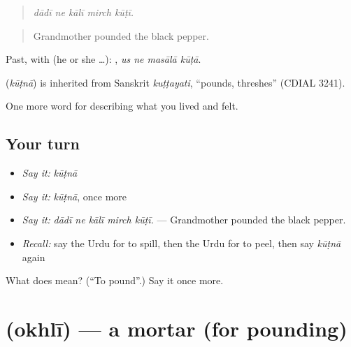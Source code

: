 \begin{quote}
    
\end{quote}

\begin{quote}
\emph{dādī ne kālī mirch kūṭī.}
\end{quote}

\begin{quote}
Grandmother pounded the black pepper.
\end{quote}

Past, with  (he or she …):    , \emph{us ne masālā kūṭā}.

\begin{cousinweb}
\textbf{} (\emph{kūṭnā}) is inherited from Sanskrit \emph{kuṭṭayati}, \textquotedblleft{}pounds, threshes\textquotedblright{} (CDIAL 3241).
\end{cousinweb}

\begin{grammarlens}[title={What you've built}]
One more word for describing what you lived and felt.
\end{grammarlens}

\subsection*{Your turn}
\begin{itemize}
\raggedright
  \item \emph{Say it:} \emph{kūṭnā}
  \item \emph{Say it:} \emph{kūṭnā}, once more
  \item \emph{Say it:} \emph{dādī ne kālī mirch kūṭī.} — Grandmother pounded the black pepper.
  \item \emph{Recall:} say the Urdu for to spill, then the Urdu for to peel, then say \emph{kūṭnā} again
\end{itemize}

\begin{tcolorbox}[breakable,colback=teal!4,colframe=teal!35!black,title={Before you move on}]
What does  mean? (\textquotedblleft{}To pound\textquotedblright{}.) Say it once more.
\end{tcolorbox}
\section[\texorpdfstring{\ur{اوکھلی} (okhlī)}{اوکھلی (okhlī)}]{ (okhlī) — a mortar (for pounding)}


